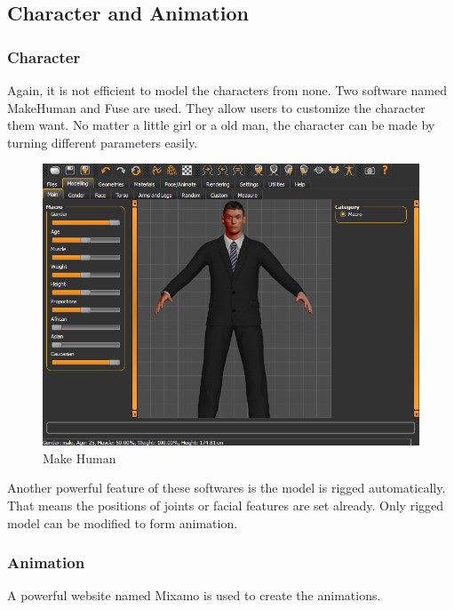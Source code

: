 \documentclass{article}
\begin{document}
\clearpage
\subsection{Character and Animation}

\subsubsection{Character}
Again, it is not efficient to model the characters from none. Two software named MakeHuman\citep{MakeHuman} and Fuse\citep{Fuse} are used. They allow users to customize the character them want. No matter a little girl or a old man, the character can be made by turning different parameters easily.

\begin{figure}[h]
\centering
\includegraphics[width=\textwidth]{character1.png}
\caption{Make Human}
\label{fig:character1}
\end{figure}

Another powerful feature of these softwares is the model is rigged automatically. That means the positions of joints or facial features are set already. Only rigged model can be modified to form animation.

\pagebreak

\subsubsection{Animation}
A powerful website named Mixamo\citep{Mixamo} is used to create the animations.

\bigskip
\end{document}
